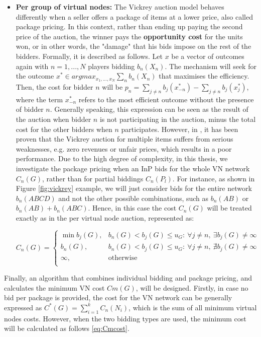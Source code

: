\begin{itemize}
    \item \textbf{Per group of virtual nodes:} The Vickrey auction model behaves differently when a seller offers a package of items at a lower price, also called package pricing. In this context, rather than ending up paying the second price of the auction, the winner pays the \textbf{opportunity cost} for the units won, or in other words, the "damage" that his bids impose on the rest of the bidders. Formally, it is described as follows. Let $x$ be a vector of outcomes again with $n = 1,...,N$ players bidding $b_n(X_n)$. The mechanism will seek for the outcome $x^{*} \in argmax_{x_1,...,x_N} \sum_{n} b_n(X_n)$ that maximises the efficiency. Then, the cost for bidder $n$ will be $p_n = \sum_{j \neq n} b_j(x^{*}_{-n}) - \sum_{j \neq n} b_j(x^{*}_{j})$, where the term $x^{*}_{-n}$ refers to the most efficient outcome without the presence of bidder $n$. Generally speaking, this expression can be seen as the result of the auction when bidder $n$ is not participating in the auction, minus the total cost for the other bidders when $n$ participates. However, in \citep{ausubel2006lovely}, it has been proven that the Vickrey auction for multiple items suffers from serious weaknesses, e.g. zero revenues or unfair prices, which results in a poor performance. Due to the high degree of complexity, in this thesis, we investigate the package pricing when an InP bids for the whole VN network $C_n(G)$, rather than for partial biddings $C_n(P_l)$. For instance, as shown in Figure \ref{fig:vickrey} example, we will just consider bids for the entire network $b_n(ABCD)$ and not the other possible combinations, such as $b_n(AB)$ or $b_n(AB) + b_n(ABC)$. Hence, in this case the cost $C_n(G)$ will be treated exactly as in the per virtual node auction, represented as:
    
  \begin{equation} \label{eq:Gcost}
   C_n(G) =
   \begin{cases}
    \min b_j(G), & b_n(G) < b_j(G) \leq u_{G} : \ \forall j \neq n, \ \exists b_j(G) \neq \infty\\
    b_n(G), & b_n(G) < b_j(G) \leq u_{G}: \ \forall j \neq n, \ \nexists b_j(G) \neq \infty \\
    \infty, & \text{otherwise } \\
  \end{cases}
  \end{equation}
\end{itemize}

Finally, an algorithm that combines individual bidding and package pricing, and calculates the minimum VN cost $Cm(G)$, will be designed. Firstly, in case no bid per package is provided, the cost for the VN network can be generally expressed as $C^{*}(G) = \sum_{i=1}^{k}C_n(N_i)$, which is the sum of all minimum virtual nodes costs. However, when the two bidding types are used, the minimum cost will be calculated as follows \ref{eq:Cmcost}.

